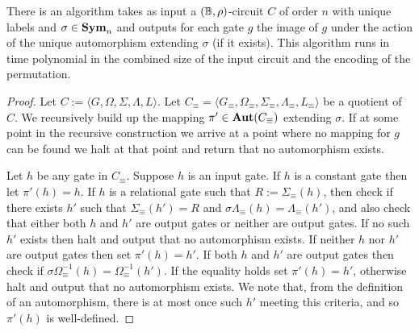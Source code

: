 \documentclass[../paper.tex]{subfiles}
\begin{document}

\begin{lem}
  There is an algorithm takes as input a $(\mathbb{B}, \rho)$-circuit $C$ of order $n$
  with unique labels and $\sigma \in \text{\textbf{Sym}}_n$ and outputs for each gate $g$ the
  image of $g$ under the action of the unique automorphism extending $\sigma$
  (if it exists). This algorithm runs in time polynomial in the combined size of
  the input circuit and the encoding of the permutation.
  \label{lem:compute-automorphisms}
\end{lem}
\begin{proof}
  Let $C := \langle G, \Omega, \Sigma, \Lambda, L \rangle$. Let $C_\equiv =
  \langle G_\equiv, \Omega_\equiv, \Sigma_\equiv, \Lambda_\equiv, L_\equiv
  \rangle$ be a quotient of $C$. We recursively build up the mapping $\pi' \in
  \text{\textbf{Aut}}(C_\equiv)$ extending $\sigma$. If at some point in the recursive
  construction we arrive at a point where no mapping for $g$ can be found we
  halt at that point and return that no automorphism exists.

  Let $h$ be any gate in $C_\equiv$. Suppose $h$ is an input gate. If $h$ is a
  constant gate then let $\pi' (h) = h$. If $h$ is a relational gate such that
  $R := \Sigma_\equiv(h)$, then check if there exists $h'$ such that
  $\Sigma_\equiv (h') = R$ and $\sigma \Lambda_\equiv(h) = \Lambda_\equiv(h')$,
  and also check that either both $h$ and $h'$ are output gates or neither are
  output gates. If no such $h'$ exists then halt and output that no automorphism
  exists. If neither $h$ nor $h'$ are output gates then set $\pi'(h) = h'$. If
  both $h$ and $h'$ are output gates then check if $\sigma \Omega^{-1}_\equiv(h)
  = \Omega^{-1}_\equiv(h')$. If the equality holds set $\pi'(h) = h'$, otherwise
  halt and output that no automorphism exists. We note that, from the definition
  of an automorphism, there is at most once such $h'$ meeting this criteria, and
  so $\pi'(h)$ is well-defined.


\end{proof}
\end{document}
